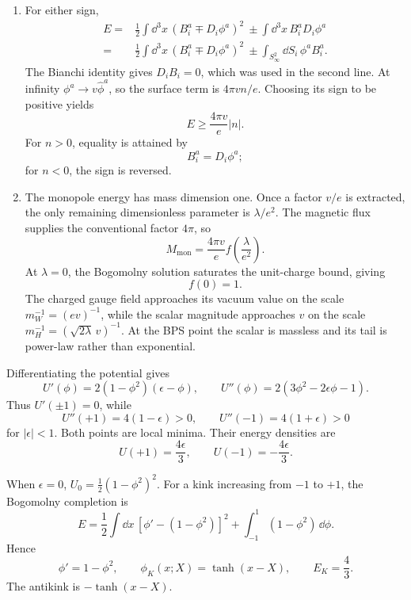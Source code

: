 \begin{enumerate}
  \begin{enumerate}
    \item[(a)]
    For either sign,
    \[
    \begin{split}
      E={}&\frac12\int \dd^3x\,
         (B_i^a\mp D_i\phi^a)^2
         \ \pm\int \dd^3x\,B_i^aD_i\phi^a\\
        ={}&\frac12\int \dd^3x\,
         (B_i^a\mp D_i\phi^a)^2
         \ \pm\int_{S^2_\infty}\dd S_i\,\phi^aB_i^a.
    \end{split}
    \]
    The Bianchi identity gives \(D_iB_i=0\), which was used in the second
    line.  At infinity \(\phi^a\to v\widehat\phi^a\), so the surface term
    is \(4\pi vn/e\).  Choosing its sign to be positive yields
    \[
      \boxed{E\ge\frac{4\pi v}{e}\lvert n\rvert.}
    \]
    For \(n>0\), equality is attained by
    \[
      \boxed{B_i^a=D_i\phi^a;}
    \]
    for \(n<0\), the sign is reversed.
    \item[(b)]
    The monopole energy has mass dimension one.  Once a factor \(v/e\) is
    extracted, the only remaining dimensionless parameter is
    \(\lambda/e^2\).  The magnetic flux supplies the conventional factor
    \(4\pi\), so
    \[
      M_{\mathrm{mon}}=\frac{4\pi v}{e}
        f\left(\frac{\lambda}{e^2}\right).
    \]
    At \(\lambda=0\), the Bogomolny solution saturates the unit-charge
    bound, giving
    \[
      \boxed{f(0)=1.}
    \]
    The charged gauge field approaches its vacuum value on the scale
    \(m_W^{-1}=(ev)^{-1}\), while the scalar magnitude approaches \(v\)
    on the scale
    \(m_H^{-1}=(\sqrt{2\lambda}\,v)^{-1}\).  At the BPS point the scalar
    is massless and its tail is power-law rather than exponential.
  \end{enumerate}

  Differentiating the potential gives
  \[
    U'(\phi)=2(1-\phi^2)(\epsilon-\phi),
    \qquad
    U''(\phi)=2(3\phi^2-2\epsilon\phi-1).
  \]
  Thus \(U'(\pm1)=0\), while
  \[
    U''(+1)=4(1-\epsilon)>0,\qquad
    U''(-1)=4(1+\epsilon)>0
  \]
  for \(|\epsilon|<1\).  Both points are local minima.  Their energy
  densities are
  \[
    U(+1)=\frac{4\epsilon}{3},\qquad
    U(-1)=-\frac{4\epsilon}{3}.
  \]

  When \(\epsilon=0\),
  \(U_0=\frac12(1-\phi^2)^2\).  For a kink increasing from
  \(-1\) to \(+1\), the Bogomolny completion is
  \[
    E=\frac12\int \dd x\,[\phi'-(1-\phi^2)]^2
      +\int_{-1}^{1}(1-\phi^2)\,\dd\phi.
  \]
  Hence
  \[
    \phi'=1-\phi^2,\qquad
    \boxed{\phi_K(x;X)=\tanh(x-X),\qquad E_K=\frac43.}
  \]
  The antikink is \(-\tanh(x-X)\).


\end{enumerate}
